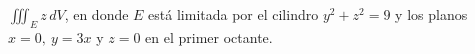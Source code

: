 \item $\iiint_E z \, dV$, en donde $E$ está limitada por el cilindro $y^2 + z^2 = 9$ y los planos $x = 0, \ y = 3x$ y $z = 0$ en el primer octante.
